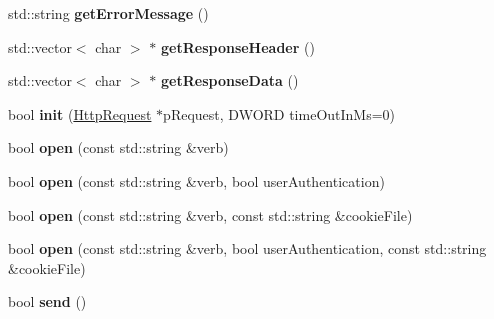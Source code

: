 \begin{DoxyCompactItemize}
\item 
\mbox{\label{classnetwork_1_1HttpConnection_afc1b2f084b6f97e39b1e5d71fc59676b}} 
std\+::string {\bfseries get\+Error\+Message} ()
\item 
\mbox{\label{classnetwork_1_1HttpConnection_a7e0bd84285034329183d738934afe97b}} 
std\+::vector$<$ char $>$ $\ast$ {\bfseries get\+Response\+Header} ()
\item 
\mbox{\label{classnetwork_1_1HttpConnection_a8cf5f94162cae74dbd10eaf456da19bf}} 
std\+::vector$<$ char $>$ $\ast$ {\bfseries get\+Response\+Data} ()
\item 
\mbox{\label{classnetwork_1_1HttpConnection_a3c47f7ed0a7668c1ef9b959d7b9e6575}} 
bool {\bfseries init} (\hyperlink{classnetwork_1_1HttpRequest}{Http\+Request} $\ast$p\+Request, D\+W\+O\+RD time\+Out\+In\+Ms=0)
\item 
\mbox{\label{classnetwork_1_1HttpConnection_afbb0babb7fb7b686417035f7c3c1c927}} 
bool {\bfseries open} (const std\+::string \&verb)
\item 
\mbox{\label{classnetwork_1_1HttpConnection_aa1fea071579664f56e7f138ec83fa8e4}} 
bool {\bfseries open} (const std\+::string \&verb, bool user\+Authentication)
\item 
\mbox{\label{classnetwork_1_1HttpConnection_a97b0931a617edfb0d3c35d25c952a102}} 
bool {\bfseries open} (const std\+::string \&verb, const std\+::string \&cookie\+File)
\item 
\mbox{\label{classnetwork_1_1HttpConnection_ab3b51b149ad8086f5924c1c99175d235}} 
bool {\bfseries open} (const std\+::string \&verb, bool user\+Authentication, const std\+::string \&cookie\+File)
\item 
\mbox{\label{classnetwork_1_1HttpConnection_a8987f7c75e00991ad41198696615a9e7}} 
bool {\bfseries send} ()
\item 
\mbox{\label{classnetwork_1_1HttpConnection_ab5eef7ca5cd1e5c05158d493613eb61a}} 

\end{DoxyCompactItemize}
